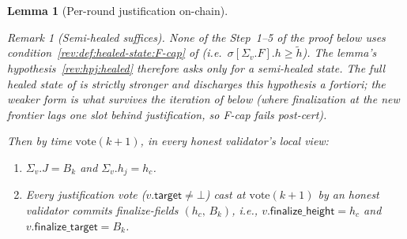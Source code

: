 \documentclass{article}
\newcommand{\target}{\mathsf{target}}
\newcommand{\finalizeHeight}{\mathsf{finalize\_height}}
\newcommand{\finalizeTarget}{\mathsf{finalize\_target}}
\newcommand{\vote}{\ensuremath{\mathrm{vote}}}
\newcommand{\comm}[1]{\ensuremath{\widetilde{#1}}}
\theoremstyle{plain}
\newtheorem{lemma}{Lemma}
\theoremstyle{definition}
\theoremstyle{remark}
\newtheorem{remark}[theorem]{Remark}
\begin{document}
\begin{lemma}[Per-round justification on-chain]
\begin{remark}[Semi-healed suffices]
None of the Step~1--5 of the proof below uses condition~\ref{rev:def:healed-state:F-cap} of  (i.e.\ $\sigma[\Sigma_v.F].h \geq \comm{h}$). The lemma's hypothesis~\ref{rev:hpj:healed} therefore asks only for a \emph{semi-healed} state. The full healed state of  is strictly stronger and discharges this hypothesis a fortiori; the weaker form is what survives the iteration of  below (where finalization at the new frontier lags one slot behind justification, so F-cap fails post-cert).
\end{remark}

Then by time $\vote(k+1)$, in every honest validator's local view:
\begin{enumerate}
  \item[\textnormal{(C1)}] $\Sigma_v.J = B_k$ and $\Sigma_v.h_j = h_c$.
  \item[\textnormal{(C2)}] Every justification vote ($v.\target \neq \bot$) cast at $\vote(k+1)$ by an honest validator commits finalize-fields $(h_c,\, B_k)$, i.e., $v.\finalizeHeight = h_c$ and $v.\finalizeTarget = B_k$.
\end{enumerate}
\end{lemma}
\end{document}

